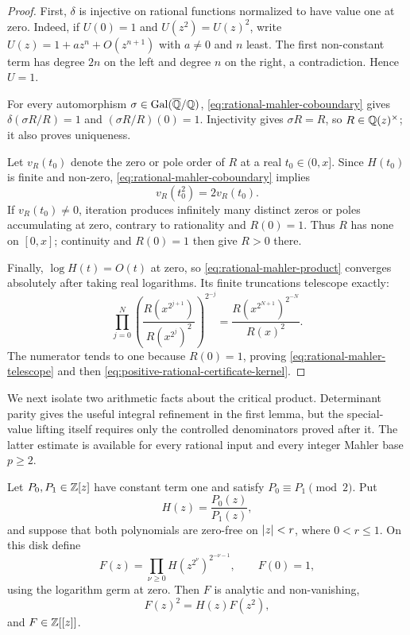 \begin{proof}
First, \(\delta\) is injective on rational functions normalized to have value
one at zero.  Indeed, if \(U(0)=1\) and \(U(z^2)=U(z)^2\), write
\(U(z)=1+az^n+O(z^{n+1})\) with \(a\ne0\) and \(n\) least.  The first
non-constant term has degree \(2n\) on the left and degree \(n\) on the
right, a contradiction.  Hence \(U=1\).

For every automorphism
\(\sigma\in\operatorname{Gal}(\overline{\mathbb{Q}}/\mathbb{Q})\),
\eqref{eq:rational-mahler-coboundary} gives
\(\delta(\sigma R/R)=1\) and \((\sigma R/R)(0)=1\).  Injectivity gives
\(\sigma R=R\), so \(R\in\mathbb{Q}(z)^\times\); it also proves uniqueness.

Let \(v_R(t_0)\) denote the zero or pole order of \(R\) at a real
\(t_0\in(0,x]\).  Since \(H(t_0)\) is finite and non-zero,
\eqref{eq:rational-mahler-coboundary} implies
\[
 v_R(t_0^2)=2v_R(t_0).
\]
If \(v_R(t_0)\ne0\), iteration produces infinitely many distinct zeros or
poles accumulating at zero, contrary to rationality and \(R(0)=1\).
Thus \(R\) has none on \([0,x]\); continuity and \(R(0)=1\) then give
\(R>0\) there.

Finally, \(\log H(t)=O(t)\) at zero, so
\eqref{eq:rational-mahler-product} converges absolutely after taking real
logarithms.  Its finite truncations telescope exactly:
\[
 \prod_{j=0}^{N}
 \left(\frac{R(x^{2^{j+1}})}{R(x^{2^j})^2}\right)^{2^{-j}}
 =\frac{R(x^{2^{N+1}})^{2^{-N}}}{R(x)^2}.
\]
The numerator tends to one because \(R(0)=1\), proving
\eqref{eq:rational-mahler-telescope} and then
\eqref{eq:positive-rational-certificate-kernel}.
\end{proof}

We next isolate two arithmetic facts about the critical product.  Determinant
parity gives the useful integral refinement in the first lemma, but the
special-value lifting itself requires only the controlled denominators proved
after it.  The latter estimate is available for every rational input and every
integer Mahler base \(p\ge2\).

\begin{lemma}
\label{lem:critical-mahler-integrality}
Let \(P_0,P_1\in\mathbb{Z}[z]\) have constant term one and satisfy
\(P_0\equiv P_1\pmod2\).  Put
\[
 H(z)=\frac{P_0(z)}{P_1(z)},
\]
and suppose that both polynomials are zero-free on \(\lvert z \rvert<r\),
where \(0<r\le1\).  On this disk define
\begin{equation}\label{eq:critical-mahler-product}
 F(z)=\prod_{\nu\ge0}H(z^{2^\nu})^{2^{-\nu-1}},
 \qquad F(0)=1,
\end{equation}
using the logarithm germ at zero.  Then \(F\) is analytic and non-vanishing,
\begin{equation}\label{eq:critical-mahler-equation}
 F(z)^2=H(z)F(z^2),
\end{equation}
and \(F\in\mathbb{Z}[[z]]\).
\end{lemma}

